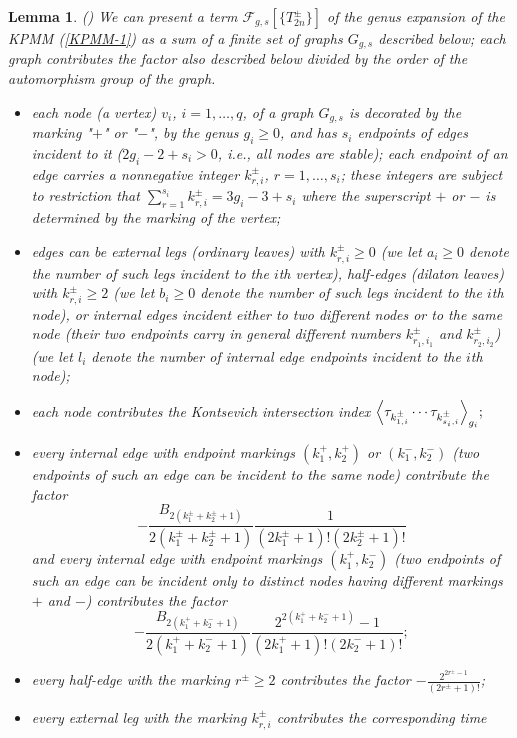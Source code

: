 \documentclass[11pt]{article}
\theoremstyle{plain}
\newtheorem{lemma}{Lemma}
\theoremstyle{definition}
\begin{document}
\begin{lemma}\label{lm:graph}{\rm(\cite{Ch95,ACNP})}
We can present a term ${\mathcal F}_{g,s}[\{T^\pm_{2n}\}]$ of the genus expansion of the KPMM (\ref{KPMM-1}) as
a sum of a finite set of graphs $G_{g,s}$ described below; each graph contributes the factor also described below divided 
by the order of the automorphism group of the graph. 
\begin{itemize}
\item each node (a vertex) $v_i$, $i=1,\dots,q$, of
a graph $G_{g,s}$ is decorated by the marking "$+$" or "$-$", by the genus $g_i\ge 0$, and has $s_i$
endpoints of edges
incident to it ($2g_i-2+s_i>0$, i.e., all nodes are stable);
each endpoint of an edge carries a nonnegative integer $k^{\pm}_{r,i}$, $r=1,\dots,s_i$; these
integers are subject to restriction that $\sum_{r=1}^{s_i}k^{\pm}_{r,i}=3g_i-3+s_i$
where the superscript $+$ or $-$ is determined by the marking of the vertex;
\item edges can be external legs (ordinary leaves) with $k^{\pm}_{r,i}\ge 0$ (we let $a_i\ge 0$ denote the number
of such legs incident to the $i$th vertex),
half-edges (dilaton leaves) with $k^{\pm}_{r,i}\ge 2$ (we let $b_i\ge 0$ denote the number
of such legs incident to the $i$th node), or internal edges incident either to two different nodes or to the same node (their two endpoints carry in general different numbers $k^{\pm}_{r_1,i_1}$ and $k^{\pm}_{r_2,i_2}$) (we let $l_i$ denote the number of internal edge endpoints
incident to the $i$th node);
\item each node contributes the Kontsevich intersection index
$
\Bigl\langle \tau_{k^{\pm}_{1,i}}\cdots \tau_{k^{\pm}_{s_i,i}}\Bigr\rangle_{g_i};
$
\item every internal edge with endpoint markings $(k_1^{+},k_2^{+})$ or $(k_1^{-},k_2^{-})$
(two endpoints of such an edge can be incident to the same node)
contribute the factor
$$
-\frac{B_{2(k^{\pm}_1+k^{\pm}_2+1)}}{2(k^{\pm}_1+k^{\pm}_2+1)}
\frac{1}{(2k^{\pm}_1+1)!(2k^{\pm}_2+1)!}
$$
and every internal edge with endpoint markings $(k_1^{+},k_2^{-})$
(two endpoints of such an edge can be incident only to distinct nodes having different markings $+$ and $-$)
contributes the factor
$$
-\frac{B_{2(k^+_1+k^-_2+1)}}{2(k^+_1+k^-_2+1)}
\frac{2^{2(k^+_1+k^-_2+1)}-1}{(2k^+_1+1)!(2k^-_2+1)!};
$$
\item every half-edge with the marking $r^{\pm}\ge 2$ contributes the factor $-\frac{2^{2r^{\pm}-1}}{(2r^{\pm}+1)!}$;
\item every external leg with the marking $k^{\pm}_{r,i}$ contributes the corresponding time

\end{itemize}
\end{lemma}
\end{document}
